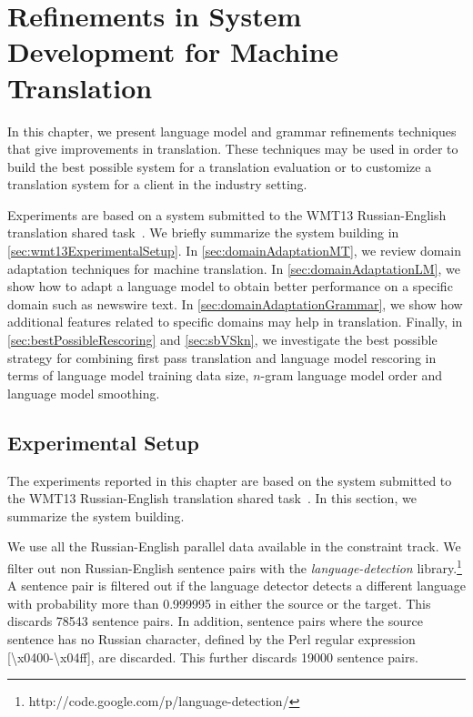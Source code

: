 \chapter{Refinements in System Development for Machine Translation}
\label{chap:wmt}


In this chapter, we present language model and grammar refinements
techniques that give improvements in translation. These techniques
may be used in order to build the best possible system for a
translation evaluation or to customize a translation system
for a client in the industry setting.

Experiments are based on a system submitted to the WMT13
Russian-English translation shared
task~\citep{pino-waite-xiao-degispert-flego-byrne:2013:WMT}.
We briefly summarize the system building in
\autoref{sec:wmt13ExperimentalSetup}.
In \autoref{sec:domainAdaptationMT}, we review domain adaptation
techniques for machine translation. In \autoref{sec:domainAdaptationLM},
we show how to adapt a language model to obtain better performance
on a specific domain such as newswire text.
In \autoref{sec:domainAdaptationGrammar}, we show how additional
features related to specific domains may help in translation.
Finally, in \autoref{sec:bestPossibleRescoring} and \autoref{sec:sbVSkn}, we investigate
the best possible strategy for combining first pass translation
and language model rescoring in terms of language model
training data size, $n$-gram language model order and
language model smoothing.

\section{Experimental Setup}
\label{sec:wmt13ExperimentalSetup}

The experiments reported in this chapter are based
on the system submitted to the WMT13 Russian-English translation shared
task~\citep{pino-waite-xiao-degispert-flego-byrne:2013:WMT}.
In this section, we summarize the system building.

We use all the Russian-English parallel data available in the constraint track.
We filter out non Russian-English sentence pairs with the
\emph{language-detection} library.\footnote{http://code.google.com/p/language-detection/}
A sentence pair is filtered out if the language detector detects a different language with probability
more than 0.999995 in either the source or the target.
This discards 78543 sentence pairs. In addition, sentence pairs where the source sentence has no Russian character, defined by the
Perl regular expression [{\textbackslash}x{0400}-{\textbackslash}x{04ff}], are discarded.
This further discards 19000 sentence pairs.

